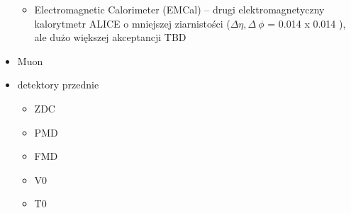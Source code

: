\begin{itemize}
\begin{itemize}
		\item Electromagnetic Calorimeter (EMCal) -- drugi elektromagnetyczny kalorytmetr ALICE o mniejszej ziarnistości ($\Delta\eta,\Delta~\phi$ = 0.014 x 0.014 ), ale dużo większej akceptancji TBD
	\end{itemize}
	\item Muon
	\item detektory przednie
	\begin{itemize}
		\item ZDC
		\item PMD
		\item FMD
		\item V0
		\item T0
	\end{itemize}
\end{itemize}






